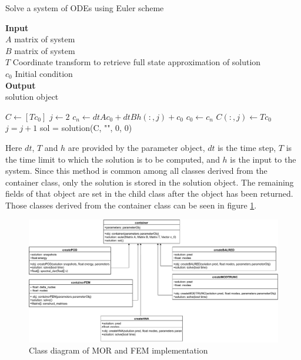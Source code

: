 \begin{algorithm}[H]
\caption{Solve a system of ODEs using Euler scheme}
\textbf{Input} \\
 \hspace*{\algorithmicindent} $A$ matrix of system \\
 \hspace*{\algorithmicindent} $B$ matrix of system \\
 \hspace*{\algorithmicindent} $T$ Coordinate transform to retrieve full state approximation of solution \\
 \hspace*{\algorithmicindent} $c_0$ Initial condition \\
 \textbf{Output} \\
 \hspace*{\algorithmicindent} solution object
\begin{algorithmic}[1]
\State $C \gets [Tc_0]$
\State $j \gets 2$
\State $c_n \gets dt A c_0 + dt B h(:, j) + c_0$
\State $c_0 \gets c_n$
\State $C(:, j) \gets T c_0$
\State $j = j+1$
\EndFor 
\State sol = solution(C, "", 0, 0)
\EndProcedure
\end{algorithmic}
\end{algorithm}
Here \(dt\), \(T\) and \(h\) are provided by the parameter object,
\(dt\) is the time step, \(T\) is the time limit to which the solution is to be computed, and \(h\) is the input to the system.
Since this method is common among all classes derived from the container class, only the solution is stored in the solution object.
The remaining fields of that object are set in the child class after the object has been returned.
Those classes derived from the container class can be seen in figure \ref{fig-class-2}.
\begin{figure}[H]
\includegraphics[width=\textwidth]{images/container}
\caption{Class diagram of MOR and FEM implementation}
\label{fig-class-2}
\end{figure}

